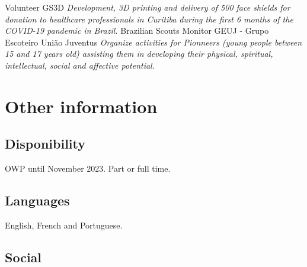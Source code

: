 \documentclass[letterpaper]{twentysecondcv} %
\begin{document}
\begin{twenty} %
						{Volunteer}
						{GS3D}
						{\emph{Development, 3D printing and delivery of 500 face shields for
						donation to healthcare professionals in Curitiba during the first 6
						months of the COVID-19 pandemic in Brazil.}}
						{Brazilian Scouts Monitor}
						{GEUJ - Grupo Escoteiro União Juventus}
						{\emph{Organize activities for Pionneers (young people between 15 
						and 17 years old) assisting them in developing their physical, 
						spiritual, intellectual, social and affective potential.}}
\end{twenty}

\section{Other information}
\subsection{Disponibility}
OWP until November 2023. Part or full time.
\subsection{Languages}
English, French and Portuguese.
\subsection{Social}
\begin{twenty}
\end{twenty}
\end{document}
